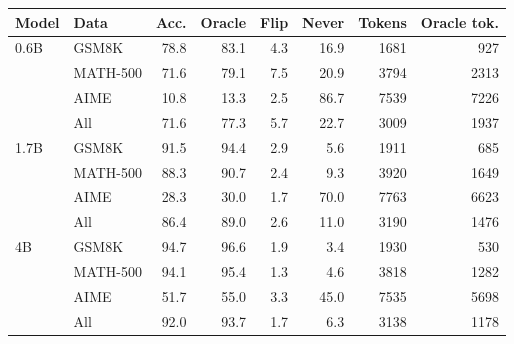 \begin{tabular}{llrrrrrr}
\toprule
Model & Data & Acc. & Oracle & Flip & Never & Tokens & Oracle tok. \\
\midrule
0.6B & GSM8K & 78.8 & 83.1 & 4.3 & 16.9 & 1681 & 927 \\
 & MATH-500 & 71.6 & 79.1 & 7.5 & 20.9 & 3794 & 2313 \\
 & AIME & 10.8 & 13.3 & 2.5 & 86.7 & 7539 & 7226 \\
 & All & 71.6 & 77.3 & 5.7 & 22.7 & 3009 & 1937 \\
\midrule
1.7B & GSM8K & 91.5 & 94.4 & 2.9 & 5.6 & 1911 & 685 \\
 & MATH-500 & 88.3 & 90.7 & 2.4 & 9.3 & 3920 & 1649 \\
 & AIME & 28.3 & 30.0 & 1.7 & 70.0 & 7763 & 6623 \\
 & All & 86.4 & 89.0 & 2.6 & 11.0 & 3190 & 1476 \\
\midrule
4B & GSM8K & 94.7 & 96.6 & 1.9 & 3.4 & 1930 & 530 \\
 & MATH-500 & 94.1 & 95.4 & 1.3 & 4.6 & 3818 & 1282 \\
 & AIME & 51.7 & 55.0 & 3.3 & 45.0 & 7535 & 5698 \\
 & All & 92.0 & 93.7 & 1.7 & 6.3 & 3138 & 1178 \\
\bottomrule
\end{tabular}
